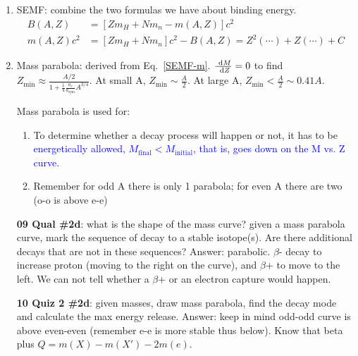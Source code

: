 \documentclass{school-22.101-notes}
\begin{document}
\begin{enumerate}
\item SEMF: combine the two formulas we have about binding energy. 
\begin{align}
B(A,Z) &= \left[ Z m_H + N m_n - m(A,Z) \right] c^2  \label{BAZ}\\
m(A,Z) c^2 &= \left[ Z m_H + N m_n \right] c^2 - B(A,Z) = Z^2 (\cdots) + Z(\cdots) + C \label{SEMF-m}
\end{align}

\item Mass parabola: derived from Eq.~\ref{SEMF-m}. $\frac{\mbox{ }\mathrm{d} M}{\mbox{ }\mathrm{d} Z} = 0$ to find $\displaystyle Z_{\mathrm{min}} \approx \frac{A/2}{1 + \frac{1}{4} \frac{a_c}{a_{\mathrm{sym}}} A^{3/4}} $. At small A, $Z_{\mathrm{min}} \sim \frac{A}{2}$. At large A, $Z_{\mathrm{min}} < \frac{A}{2} \sim 0.41 A$. 

Mass parabola is used for: 
    \begin{enumerate}
    \item To determine whether a decay process will happen or not, it has to be \textcolor{blue}{energetically allowed, $M_{\mathrm{final}} < M_{\mathrm{initial}}$, that is, goes down on the M vs. Z curve.}
    \item Remember for odd A there is only 1 parabola; for even A there are two (o-o is above e-e)
    \end{enumerate}
\textbf{09 Qual \#2d}: what is the shape of the mass curve? given a mass parabola curve, mark the sequence of decay to a stable isotope(s). Are there additional decays that are not in these sequences? Answer: parabolic. $\beta$- decay to increase proton (moving to the right on the curve), and $\beta$+ to move to the left. We can not tell whether a $\beta$+ or an electron capture would happen. 

\textbf{10 Quiz 2 \#2d}: given masses, draw mass parabola, find the decay mode and calculate the max energy release. Answer: keep in mind odd-odd curve is above even-even (remember e-e is more stable thus below). Know that beta plus $Q = m(X) - m(X') - 2m(e)$. 

\end{enumerate}
\end{document}

